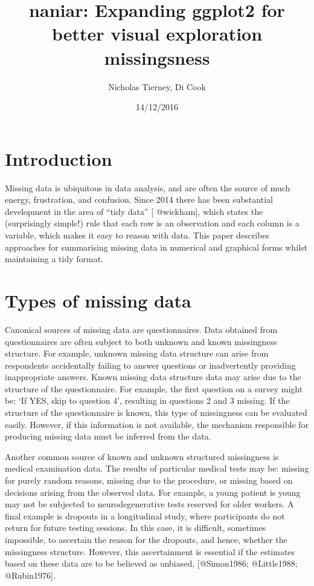 \documentclass[]{article}
\title{naniar: Expanding ggplot2 for better visual exploration missingsness}
\author{Nicholas Tierney, Di Cook}
\date{14/12/2016}
\begin{document}
\maketitle

\section{Introduction}\label{introduction}

Missing data is ubiquitous in data analysis, and are often the source of
much energy, frustration, and confusion. Since 2014 there has been
substantial development in the area of ``tidy data'' {[} @wickham{]},
which states the (surprisingly simple!) rule that each row is an
observation and each column is a variable, which makes it easy to reason
with data. This paper describes approaches for summarising missing data
in numerical and graphical forms whilst maintaining a tidy format.

\section{Types of missing data}\label{types-of-missing-data}

Canonical sources of missing data are questionnaires. Data obtained from
questionnaires are often subject to both unknown and known missingness
structure. For example, unknown missing data structure can arise from
respondents accidentally failing to answer questions or inadvertently
providing inappropriate answers. Known missing data structure data may
arise due to the structure of the questionnaire. For example, the first
question on a survey might be: `If YES, skip to question 4', resulting
in questions 2 and 3 missing. If the structure of the questionnaire is
known, this type of missingness can be evaluated easily. However, if
this information is not available, the mechanism responsible for
producing missing data must be inferred from the data.

Another common source of known and unknown structured missingness is
medical examination data. The results of particular medical tests may
be: missing for purely random reasons, missing due to the procedure, or
missing based on decisions arising from the observed data. For example,
a young patient is young may not be subjected to neurodegenerative tests
reserved for older workers. A final example is dropouts in a
longitudinal study, where participants do not return for future testing
sessions. In this case, it is difficult, sometimes impossible, to
ascertain the reason for the dropouts, and hence, whether the
missingness structure. However, this ascertainment is essential if the
estimates based on these data are to be believed as unbiased,
{[}@Simon1986; @Little1988; @Rubin1976{]}.
\end{document}
